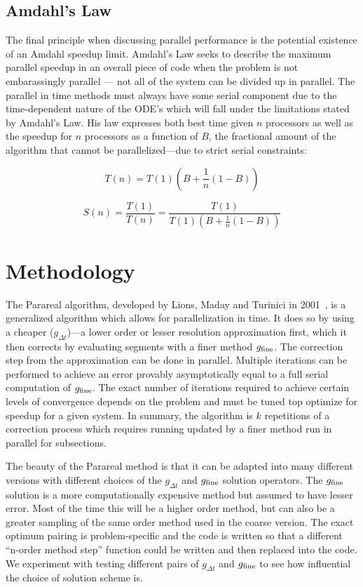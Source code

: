 \documentclass[letterpaper,12pt]{article}
\begin{document}
\subsection{Amdahl's Law}

The final principle when discussing parallel performance is the potential existence of an Amdahl speedup limit. Amdahl's Law seeks to describe the maximum parallel speedup in an overall piece of code when the problem is not embarassingly parallel --- not all of the system can be divided up in parallel. The parallel in time methods must always have some serial component due to the time-dependent nature of the ODE's which will fall under the limitations stated by Amdahl's Law. His law expresses both best time given $n$ processors as well as the speedup for $n$ processors as a function of $B$, the fractional amount of the algorithm that cannot be parallelized---due to strict serial constraints:

\begin{equation}
T(n) = T(1) \left( B + \frac{1}{n} (1-B) \right)
\end{equation}

\begin{equation}
S(n) = \frac{T(1)}{T(n)} = \frac{T(1)}{ T(1) \left( B + \frac{1}{n} (1-B) \right)}
\end{equation}

\section{Methodology}

The Parareal algorithm, developed by Lions, Maday and Turinici in
2001~\cite{lions2001parareal}, is a generalized algorithm which allows for
parallelization in time. It does so by using a cheaper ($g_{\Delta t}$)---a
lower order or lesser resolution approximation first, which it then corrects by
evaluating segments with a finer method $g_{\textnormal{fine}}$. The correction
step from the approximation can be done in parallel. Multiple iterations can be
performed to achieve an error provably asymptotically equal to a full serial
computation of $g_{\textnormal{fine}}$. The exact number of iterations required
to achieve certain levels of convergence depends on the problem and must be
tuned top optimize for speedup for a given system. In summary, the algorithm is
$k$ repetitions of a correction process which requires running updated by a
finer method run in parallel for subsections.

The beauty of the Parareal method is that it can be adapted into many different versions with different choices of the $g_{\Delta t}$ and $g_{\textnormal{fine}}$ solution operators. The $g_{\textnormal{fine}}$ solution is a more computationally expensive method but assumed to have lesser error. Most of the time this will be a higher order method, but can also be a greater sampling of the same order method used in the coarse version. The exact optimum pairing is problem-specific and the code is written so that a different ``n-order method step'' function could be written and then replaced into the code. We experiment with testing different pairs of $g_{\Delta t}$ and $g_{\textnormal{fine}}$ to see how influential the choice of solution scheme is.
\end{document}

